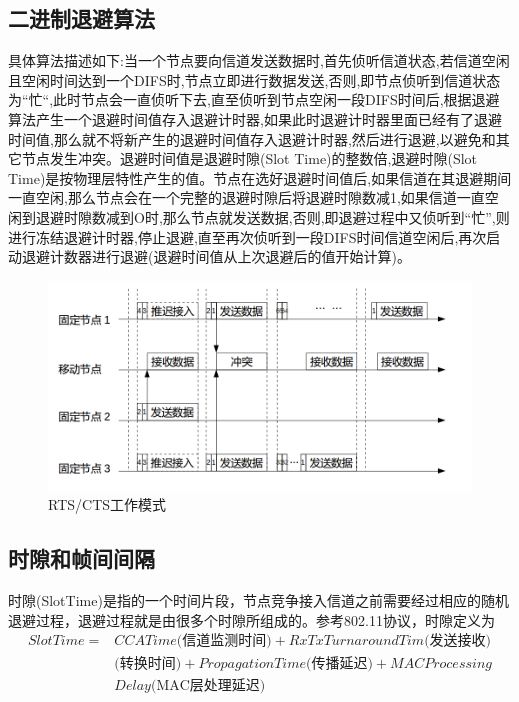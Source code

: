 \subsection{二进制退避算法}
具体算法描述如下:当一个节点要向信道发送数据时,首先侦听信道状态,若信道空闲且空闲时间达到一个DIFS时,节点立即进行数据发送,否则,即节点侦听到信道状态为“忙“,此时节点会一直侦听下去,直至侦听到节点空闲一段DIFS时间后,根据退避算法产生一个退避时间值存入退避计时器,如果此时退避计时器里面已经有了退避时间值,那么就不将新产生的退避时间值存入退避计时器,然后进行退避,以避免和其它节点发生冲突。退避时间值是退避时隙(Slot Time)的整数倍,退避时隙(Slot Time)是按物理层特性产生的值。节点在选好退避时间值后,如果信道在其退避期间一直空闲,那么节点会在一个完整的退避时隙后将退避时隙数减1,如果信道一直空闲到退避时隙数减到O时,那么节点就发送数据,否则,即退避过程中又侦听到“忙”,则进行冻结退避计时器,停止退避,直至再次侦听到一段DIFS时间信道空闲后,再次启动退避计数器进行退避(退避时间值从上次退避后的值开始计算)。
\begin{figure}[ht]
	\centering
	\includegraphics[scale=0.4]{figures/backoff.png}
	\caption{
		RTS/CTS工作模式
	}
	\label{fig:example}
\end{figure}
\subsection{时隙和帧间间隔}
时隙(SlotTime)是指的一个时间片段，节点竞争接入信道之前需要经过相应的随机退避过程，退避过程就是由很多个时隙所组成的。参考802.11协议，时隙定义为
\begin{equation}
\begin{aligned}
SlotTime=&CCATime\mbox{(信道监测时间)}+RxTxTurnaroundTim\mbox{(发送接收)}\\&\mbox{(转换时间)}+PropagationTime\mbox{(传播延迟)}+MACProcessing\\&Delay\mbox{(MAC层处理延迟)}
\end{aligned}
\end{equation}

